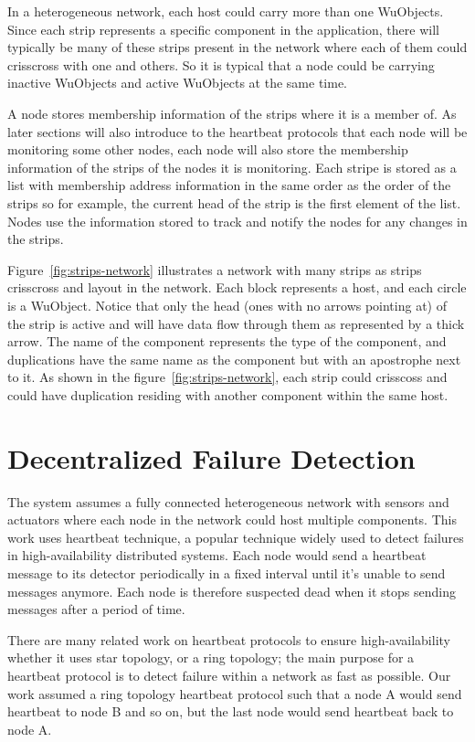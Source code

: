 In a heterogeneous network, each host could carry more than one WuObjects.
Since each strip represents a specific component in the application, there will
typically be many of these strips present in the network where each of them
could crisscross with one and others. So it is typical that a node could be
carrying inactive WuObjects and active WuObjects at the same time.

A node stores membership information of the strips where it is a member of. As
later sections will also introduce to the heartbeat protocols that each node will
be monitoring some other nodes, each node will also store the membership
information of the strips of the nodes it is monitoring. Each stripe is stored
as a list with membership address information in the same order as the order of the
strips so for example, the current head of the strip is the first element of
the list. Nodes use the information stored to track and notify the nodes for
any changes in the strips.

Figure~\ref{fig:strips-network} illustrates a network with many strips as
strips crisscross and layout in the network. Each block represents a host, and
each circle is a WuObject. Notice that only the head (ones with no arrows
pointing at) of the strip is active and will have data flow through them as
represented by a thick arrow. The name of the component represents the type of
the component, and duplications have the same name as the component but with an
apostrophe next to it. As shown in the figure~\ref{fig:strips-network}, each
strip could crisscoss and could have duplication residing with another component
within the same host.

\section{Decentralized Failure Detection}
\label{s:dfd}

The system assumes a fully connected heterogeneous network with sensors and
actuators where each node in the network could host multiple components. This
work uses heartbeat technique, a popular technique widely used to detect
failures in high-availability distributed systems. Each node would send
a heartbeat message to its detector periodically in a fixed interval
until it's unable to send messages anymore. Each node is therefore suspected
dead when it stops sending messages after a period of time.

There are many related work on heartbeat protocols to ensure high-availability
whether it uses star topology, or a ring topology; the main purpose for
a heartbeat protocol is to detect failure within a network as fast as possible.
Our work assumed a ring topology heartbeat protocol such that a node A would
send heartbeat to node B and so on, but the last node would send heartbeat back
to node A.

